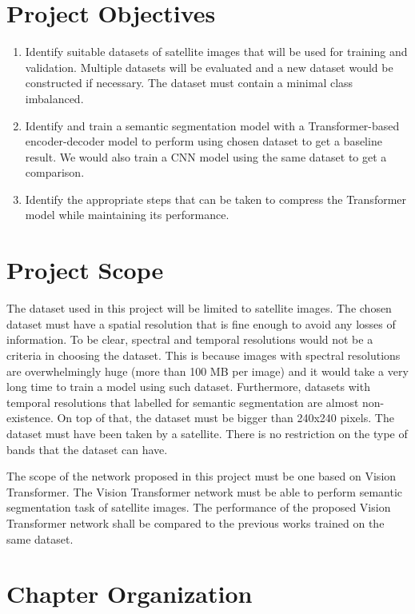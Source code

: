 \section{Project Objectives}
\begin{enumerate}
    \item Identify suitable datasets of satellite images that will be used for training and validation. Multiple datasets will be evaluated and a new dataset would be constructed if necessary. The dataset must contain a minimal class imbalanced.
    \item Identify and train a semantic segmentation model with a Transformer-based encoder-decoder model to perform using chosen dataset to get a baseline result. We would also train a CNN model using the same dataset to get a comparison.
    \item Identify the appropriate steps that can be taken to compress the Transformer model while maintaining its performance.
\end{enumerate}
\section{Project Scope}

The dataset used in this project will be limited to satellite images. The chosen dataset must have a spatial resolution that is fine enough to avoid any losses of information. To be clear, spectral and temporal resolutions would not be a criteria in choosing the dataset. This is because images with spectral resolutions are overwhelmingly huge (more than 100 MB per image) and it would take a very long time to train a model using such dataset. Furthermore, datasets with temporal resolutions that labelled for semantic segmentation are almost non-existence. On top of that, the dataset must be bigger than 240x240 pixels. The dataset must have been taken by a satellite. There is no restriction on the type of bands that the dataset can have.

The scope of the network proposed in this project must be one based on Vision Transformer.  The Vision Transformer network must be able to perform semantic segmentation task of satellite images. The performance of the proposed Vision Transformer network shall be compared to the  previous works trained on the same dataset.

\section{Chapter Organization}

